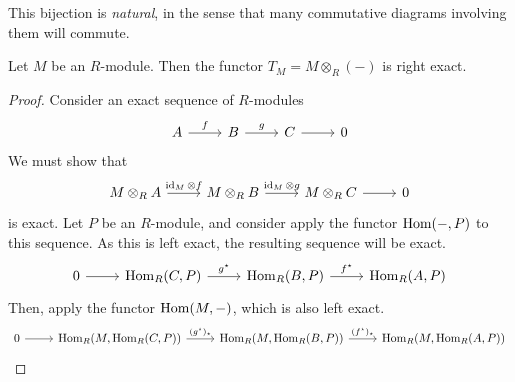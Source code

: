 This bijection is \emph{natural}, in the sense that many commutative diagrams involving them will commute.
\begin{proposition}
    Let \( M \) be an \( R \)-module.
    Then the functor \( T_M = M \otimes_R (-) \) is right exact.
\end{proposition}
\begin{proof}
    Consider an exact sequence of \( R \)-modules
\[\begin{tikzcd}
	A & B & C & 0
	\arrow["f", from=1-1, to=1-2]
	\arrow["g", from=1-2, to=1-3]
	\arrow[from=1-3, to=1-4]
\end{tikzcd}\]
    We must show that
\[\begin{tikzcd}
	{M \otimes_R A} & {M \otimes_R B} & {M \otimes_R C} & 0
	\arrow["{\id_M \otimes f}", from=1-1, to=1-2]
	\arrow["{\id_M \otimes g}", from=1-2, to=1-3]
	\arrow[from=1-3, to=1-4]
\end{tikzcd}\]
    is exact.
    Let \( P \) be an \( R \)-module, and consider apply the functor \( \operatorname{Hom}(-, P) \) to this sequence.
    As this is left exact, the resulting sequence will be exact.
\[\begin{tikzcd}
	0 & {\Hom_R(C, P)} & {\Hom_R(B, P)} & {\Hom_R(A, P)}
	\arrow[from=1-1, to=1-2]
	\arrow["{g^\star}", from=1-2, to=1-3]
	\arrow["{f^\star}", from=1-3, to=1-4]
\end{tikzcd}\]
    Then, apply the functor \( \operatorname{Hom}(M, -) \), which is also left exact.
\[\begin{tikzcd}
	0 & {\Hom_R(M, \Hom_R(C, P))} & {\Hom_R(M, \Hom_R(B, P))} & {\Hom_R(M, \Hom_R(A, P))}
	\arrow[from=1-1, to=1-2]
	\arrow["{(g^\star)_\star}", from=1-2, to=1-3]
	\arrow["{(f^\star)_\star}", from=1-3, to=1-4]
\end{tikzcd}\]

\end{proof}
